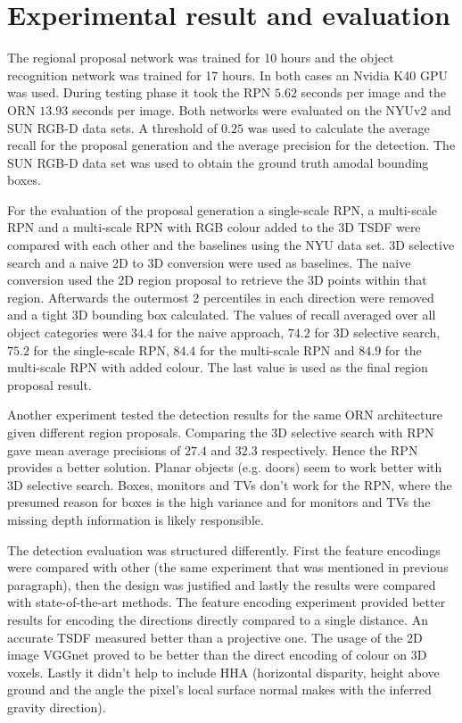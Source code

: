 \documentclass[12pt]{scrartcl}
\begin{document}
\section{Experimental result and evaluation}

The regional proposal network was trained for 10 hours and the object recognition
network was trained for 17 hours. In both cases an Nvidia K40 GPU was used.
During testing phase it took the RPN \(5.62\) seconds per image and the ORN
\(13.93\) seconds per image. Both networks were evaluated on the NYUv2\cite{Silberman2012}
and SUN RGB-D\cite{Song2015} data sets.
A threshold of \(0.25\) was used to calculate the average recall for the proposal
generation and the average precision for the detection. The SUN RGB-D data set
was used to obtain the ground truth amodal bounding boxes.

For the evaluation of the proposal generation a single-scale RPN, a multi-scale RPN
and a multi-scale RPN with RGB colour added to the 3D TSDF were compared with
each other and the baselines using the NYU data set. 3D selective search
and a naive 2D to 3D conversion were used as baselines. The naive conversion used the
2D region proposal to retrieve the 3D points within that region. Afterwards the
outermost 2 percentiles in each direction were removed and a tight 3D bounding
box calculated. The values of recall averaged over all object categories were
\(34.4\) for the naive approach, \(74.2\) for 3D selective search, \(75.2\) for
the single-scale RPN, \(84.4\) for the multi-scale RPN and \(84.9\) for the
multi-scale RPN with added colour. The last value is used as the final region
proposal result.

Another experiment tested the detection results for the same ORN architecture
given different region proposals. Comparing the 3D selective search with
RPN gave mean average precisions of \(27.4\) and \(32.3\) respectively. Hence
the RPN provides a better solution. Planar objects (e.g. doors) seem to work
better with 3D selective search. Boxes, monitors and TVs don't work for the RPN,
where the presumed reason for boxes is the high variance and for monitors and TVs
the missing depth information is likely responsible.

The detection evaluation was structured differently. First the feature encodings
were compared with other (the same experiment that was mentioned in previous
paragraph), then the design was justified and lastly the results were compared
with state-of-the-art methods. The feature encoding experiment provided better
results for encoding the directions directly compared to a single distance.
An accurate TSDF measured better than a projective one. The usage of the 2D image
VGGnet proved to be better than the direct encoding of colour on 3D voxels.
Lastly it didn't help to include HHA (horizontal disparity, height above ground
and the angle the pixel's local surface normal makes with the inferred gravity
direction).
\end{document}

